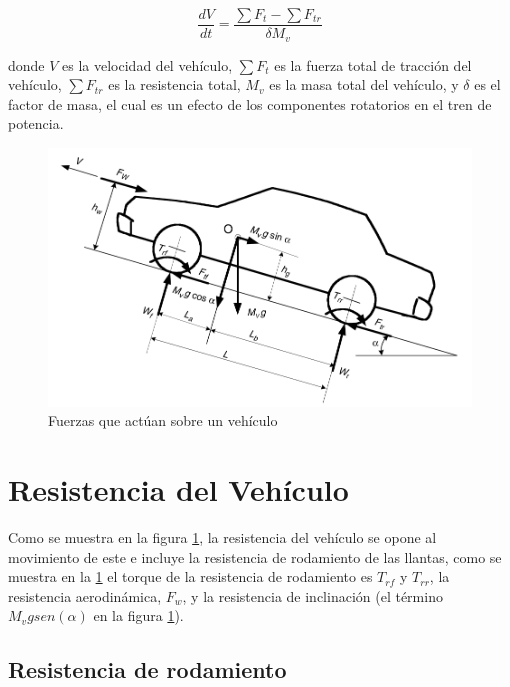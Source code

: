 \documentclass[12pt]{book}
\theoremstyle{definition}
\theoremstyle{remark}
\theoremstyle{plain}
\begin{document}
\begin{equation}
 \label{equ100}
\frac{dV}{dt}=\frac{\sum F_t- \sum F_{tr}}{\delta M_v}
\end{equation} 

donde $V$ es la velocidad del vehículo, $\sum F_t$ es la fuerza total de tracción del vehículo, 
$\sum F_{tr}$ es la resistencia total, $M_v$ es la masa total del vehículo, y $\delta$ es el 
factor de masa, el cual es un efecto de los componentes rotatorios en el tren de potencia.
\begin{figure}
\centering
\includegraphics[width=5in]{vehiculo.png}
\caption{Fuerzas que actúan sobre un vehículo \cite{MehrdadEhsani2005}}
\label{fig100}
\end{figure}

\section{Resistencia del Vehículo}

Como se muestra en la figura \ref{fig100}, la resistencia del vehículo se opone al movimiento
de este e incluye la resistencia de rodamiento de las llantas, como se muestra en la \ref{fig100}
el torque de la resistencia de rodamiento es $T_{rf}$ y $T_{rr}$, la resistencia aerodinámica,
$F_{w}$, y la resistencia de inclinación (el término $M_v g sen (\alpha)$ en la figura \ref{fig100}).

\subsection{Resistencia de rodamiento}
\end{document}
